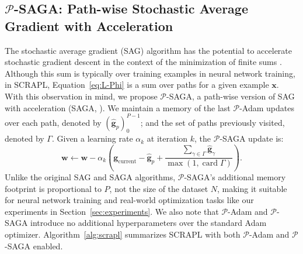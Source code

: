 \documentclass{article} %
\theoremstyle{plain}
\theoremstyle{definition}
\theoremstyle{remark}
\DeclareMathOperator{\Card}{card}
\begin{document}
\subsection{$\mathcal{P}$-SAGA: Path-wise Stochastic Average Gradient with Acceleration}
\label{ssec:saga}
The stochastic average gradient (SAG) algorithm has the potential to accelerate stochastic gradient descent in the context of the minimization of finite sums \citep{schmidt2017minimizing}.
Although this sum is typically over training examples in neural network training, in SCRAPL, Equation~\ref{eq:L-Phi} is a sum over paths for a given example $\boldsymbol{x}$.
With this observation in mind, we propose $\mathcal{P}$-SAGA, a path-wise version of SAG with acceleration (SAGA, \cite{defazio2014saga}).
We maintain a memory of the last $\mathcal{P}$-Adam updates over each path, denoted by $(\boldsymbol{\hat{g}}_p)_0^{P-1}$; and the set of paths previously visited, denoted by $\Gamma$.
Given a learning rate $\alpha_k$ at iteration $k$, the $\mathcal{P}$-SAGA update is:
\begin{equation}
\boldsymbol{w} \leftarrow \boldsymbol{w} -
\alpha_k \left(
\boldsymbol{g}_{\mathrm{current}} -
\boldsymbol{\hat{g}}_p +
\dfrac{\sum_{\gamma\in\Gamma} \boldsymbol{\hat{g}}_{\gamma}}{\max(1,\Card \Gamma)}
\right).
\end{equation}
Unlike the original SAG and SAGA algorithms, $\mathcal{P}$-SAGA's additional memory footprint is proportional to $P$, not the size of the dataset $N$, making it suitable for neural network training and real-world optimization tasks like our experiments in Section~\ref{sec:experiments}.
We also note that $\mathcal{P}$-Adam and $\mathcal{P}$-SAGA introduce no additional hyperparameters over the standard Adam optimizer.
Algorithm~\ref{alg:scrapl} summarizes SCRAPL with both $\mathcal{P}$-Adam and $\mathcal{P}$-SAGA enabled.
\end{document}
